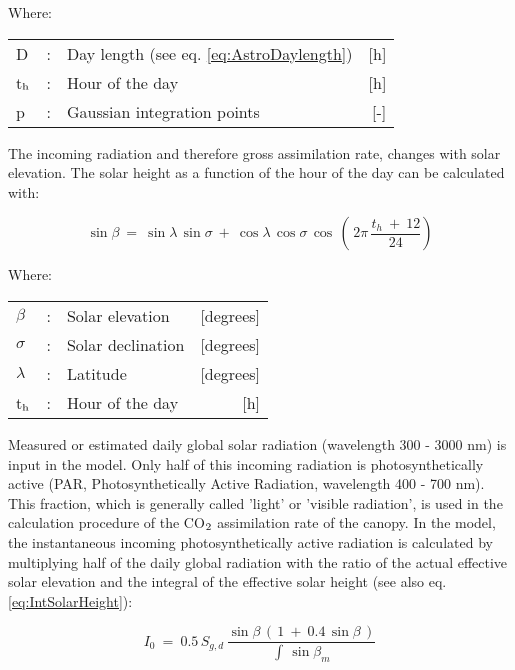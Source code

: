 Where:\\[5pt]
\begin{tabularx}{\textwidth}{llXr}
	D &:& Day length (see eq. \ref{eq:AstroDaylength})    &    [h]\\
	t$_{{\rm h}}$ &:& Hour of the day  &      [h]\\
	p &:& Gaussian integration points  &      [-]\\
\end{tabularx}

The incoming radiation and therefore gross assimilation rate, changes with solar elevation. 
The solar height as a function of the hour of the day can be calculated with:

\begin{equation}
\label{eq:5.7}
\sin \beta ~=~ \sin \lambda \, \sin \sigma ~+~ \cos \lambda \, \cos \sigma \, \cos \, 
(\, 2 \pi \,{\frac{t _{h} ~+~ 12}{24}} )
\end{equation}


Where:\\[5pt]
\begin{tabularx}{\textwidth}{llXr}
	$\beta$ &:& Solar elevation   &    [degrees]\\
	$\sigma$ &:& Solar declination    &    [degrees]\\
	$\lambda$ &:& Latitude     &   [degrees]\\
	t$_{{\rm h}}$ &:& Hour of the day    &    [h]\\
\end{tabularx}

Measured or estimated daily global solar radiation  (wavelength 300 - 3000 nm) is input
in the model. Only half of this incoming radiation is photosynthetically active (PAR,
Photosynthetically Active Radiation, wavelength 400 - 700 nm). This fraction, which is
generally called 'light' or 'visible radiation', is used in the calculation procedure of the
CO$_{{\rm 2}}$ assimilation rate of the canopy. In the model, the instantaneous incoming 
photosynthetically active radiation is calculated by multiplying half of the daily global radiation
with the ratio of the actual effective solar elevation and the integral of the effective solar
height (see also eq. \ref{eq:IntSolarHeight}):

\begin{equation}
\label{eq:5.8}
I _{0} ~=~ 0.5\, S _{g,d} \,{\frac{\sin \beta \, (\, 1~+~0.4\, \sin \beta \, )}{\int \, \sin \beta _{m} }}
\end{equation}

